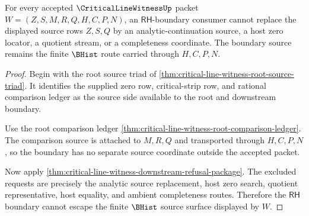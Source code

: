 \begin{theorem}
\label{thm:critical-line-witness-rh-boundary-source-nonescape}
For every accepted $\CriticalLineWitnessUp$ packet $W=(Z,S,M,R,Q,H,C,P,N)$, an $\mathsf{RH}$-boundary consumer cannot replace the displayed source rows $Z,S,Q$ by an analytic-continuation source, a host zero locator, a quotient stream, or a completeness coordinate. The boundary source remains the finite $\BHist$ route carried through $H,C,P,N$.
\end{theorem}
\begin{proof}
Begin with the root source triad of \autoref{thm:critical-line-witness-root-source-triad}. It identifies the supplied zero row, critical-strip row, and rational comparison ledger as the source side available to the root and downstream boundary.

Use the root comparison ledger \autoref{thm:critical-line-witness-root-comparison-ledger}. The comparison source is attached to $M,R,Q$ and transported through $H,C,P,N$, so the boundary has no separate source coordinate outside the accepted packet.

Now apply \autoref{thm:critical-line-witness-downstream-refusal-package}. The excluded requests are precisely the analytic source replacement, host zero search, quotient representative, host equality, and ambient completeness routes. Therefore the $\mathsf{RH}$ boundary cannot escape the finite $\BHist$ source surface displayed by $W$.
\end{proof}

